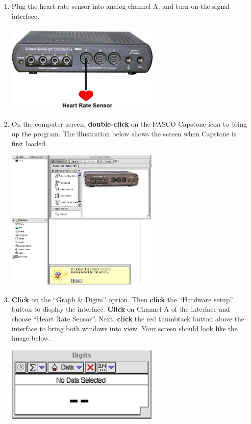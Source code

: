 \begin{enumerate}[label=\arabic*.]

\item Plug the heart rate sensor into analog channel A, and turn on the signal interface. 
\begin{center} \includegraphics*[width=0.6\textwidth]{imgs/6labs/6Alab/6Aexp1/6A-Exp1-fig4_new.jpg} \end{center} 

\item On the computer screen, \textbf{double-click } on the PASCO Capstone icon to bring up the program.  The illustration below shows the screen when Capstone is first loaded.  
\begin{center} \includegraphics*[width=0.6\textwidth]{imgs/6labs/6Alab/6Aexp1/6A-Exp1_fig3.jpg} \end{center}

\item \textbf{Click} on the ``Graph \& Digits'' option.  Then \textbf{click} the ``Hardware setup'' button to display the interface.  \textbf{Click} on Channel A of the interface and choose ``Heart Rate Sensor''.  Next, \textbf{click} the red thumbtack button above the interface to bring both windows into view.  Your screen should look like the image below.
\begin{center} \includegraphics*[width=0.6\textwidth]{imgs/6labs/6Alab/6Aexp1/6A-Exp1_fig5.jpg} \end{center}


\end{enumerate}
